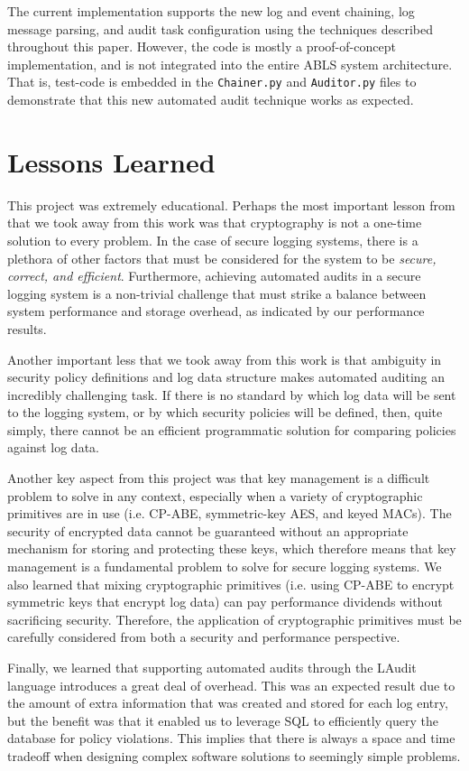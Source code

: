 \documentclass{sig-alternate}
\begin{document}
The current implementation supports the new log and event chaining, log message parsing, and 
audit task configuration using the techniques described throughout this paper. However, the code is mostly a 
proof-of-concept implementation, and is not integrated into the entire ABLS system architecture. That is, test-code is 
embedded in the {\tt Chainer.py} and {\tt Auditor.py} files to demonstrate that this new automated audit technique works as 
expected.

\section{Lessons Learned}
This project was extremely educational. Perhaps the most important lesson from that we took away from this work
was that cryptography is not a one-time solution to every problem. In the case of secure logging systems, there
is a plethora of other factors that must be considered for the system to be \emph{secure, correct, and efficient}. 
Furthermore, achieving automated audits in a secure logging system is a non-trivial challenge that must strike a 
balance between system performance and storage overhead, as indicated by our performance results. 

Another important less that we took away from this work is that ambiguity in security policy definitions and log
data structure makes automated auditing an incredibly challenging task. If there is no standard by which log 
data will be sent to the logging system, or by which security policies will be defined, then, quite simply, there cannot 
be an efficient programmatic solution for comparing policies against log data. 

Another key aspect from this project was that key management is a difficult problem to solve in any context, especially
when a variety of cryptographic primitives are in use (i.e. CP-ABE, symmetric-key AES, and keyed MACs). The security
of encrypted data cannot be guaranteed without an appropriate mechanism for storing and protecting these keys, which
therefore means that key management is a fundamental problem to solve for secure logging systems. We also learned
that mixing cryptographic primitives (i.e. using CP-ABE to encrypt symmetric keys that encrypt log data) can pay 
performance dividends without sacrificing security. Therefore, the application of cryptographic primitives must be
carefully considered from both a security and performance perspective. 

Finally, we learned that supporting automated audits through the LAudit language introduces a great deal of overhead. 
This was an expected result due to the amount of extra information that was created and stored for each log entry,
but the benefit was that it enabled us to leverage SQL to efficiently query the database for policy violations. This 
implies that there is always a space and time tradeoff when designing complex software solutions to seemingly simple 
problems.
\end{document}
